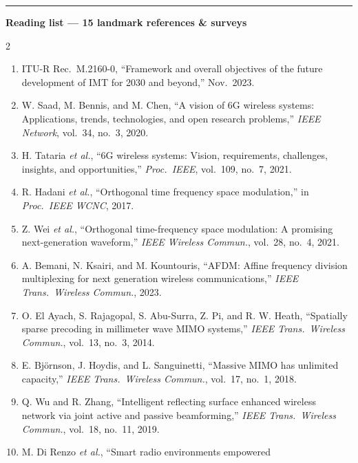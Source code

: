 \documentclass[a4paper,9pt]{extarticle}
\begin{document}
\vspace{2pt}
\hrule
\vspace{3pt}

{\color{accent}\bfseries Reading list --- 15 landmark references \& surveys}
\vspace{2pt}

\begin{multicols}{2}
\footnotesize
\begin{enumerate}[leftmargin=1.4em,itemsep=0.5pt]
  \item ITU-R Rec.\ M.2160-0, ``Framework and overall objectives of the
        future development of IMT for 2030 and beyond,'' Nov.\ 2023.
  \item W. Saad, M. Bennis, and M. Chen, ``A vision of 6G wireless
        systems: Applications, trends, technologies, and open research
        problems,'' \emph{IEEE Network}, vol.\ 34, no.\ 3, 2020.
  \item H. Tataria \emph{et al.}, ``6G wireless systems: Vision,
        requirements, challenges, insights, and opportunities,''
        \emph{Proc.\ IEEE}, vol.\ 109, no.\ 7, 2021.
  \item R. Hadani \emph{et al.}, ``Orthogonal time frequency space
        modulation,'' in \emph{Proc.\ IEEE WCNC}, 2017.
  \item Z. Wei \emph{et al.}, ``Orthogonal time-frequency space
        modulation: A promising next-generation waveform,'' \emph{IEEE
        Wireless Commun.}, vol.\ 28, no.\ 4, 2021.
  \item A. Bemani, N. Ksairi, and M. Kountouris, ``AFDM: Affine frequency
        division multiplexing for next generation wireless
        communications,'' \emph{IEEE Trans.\ Wireless Commun.}, 2023.
  \item O. El Ayach, S. Rajagopal, S. Abu-Surra, Z. Pi, and R. W. Heath,
        ``Spatially sparse precoding in millimeter wave MIMO systems,''
        \emph{IEEE Trans.\ Wireless Commun.}, vol.\ 13, no.\ 3, 2014.
  \item E. Bj\"ornson, J. Hoydis, and L. Sanguinetti, ``Massive MIMO has
        unlimited capacity,'' \emph{IEEE Trans.\ Wireless Commun.},
        vol.\ 17, no.\ 1, 2018.
  \item Q. Wu and R. Zhang, ``Intelligent reflecting surface enhanced
        wireless network via joint active and passive beamforming,''
        \emph{IEEE Trans.\ Wireless Commun.}, vol.\ 18, no.\ 11, 2019.
  \item M. Di Renzo \emph{et al.}, ``Smart radio environments empowered

\end{enumerate}
\end{multicols}
\end{document}
